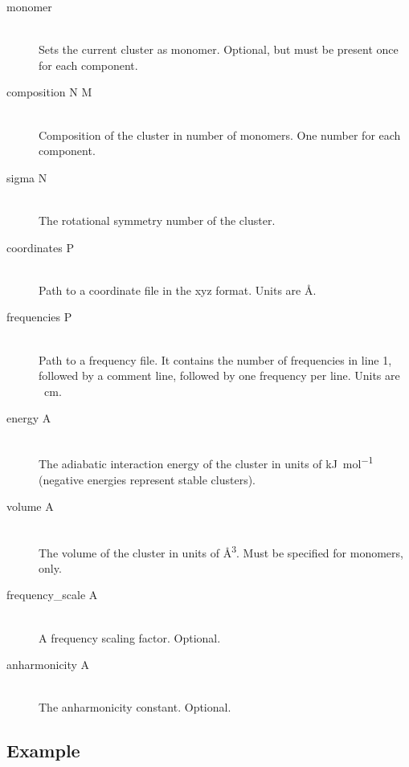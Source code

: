 \documentclass{scrartcl}
\begin{document}
\begin{description}
    \item[monomer] \hfill \\
        Sets the current cluster as monomer.
        Optional, but must be present once for each component.
        \vspace{0.1cm}
    \item[composition N M] \hfill \\
        Composition of the cluster in number of monomers.
        One number for each component.
        \vspace{0.1cm}
    \item[sigma N] \hfill \\
        The rotational symmetry number of the cluster.
        \vspace{0.1cm}
    \item[coordinates P] \hfill \\
        Path to a coordinate file in the xyz format.
        Units are \si{\angstrom}.
        \vspace{0.1cm}
    \item[frequencies P] \hfill \\
        Path to a frequency file.
        It contains the number of frequencies in line 1, followed by a comment line, followed by one frequency per line.
        Units are \si{\per\centi\meter}.
        \vspace{0.1cm}
    \item[energy A] \hfill \\
        The adiabatic interaction energy of the cluster in units of \si{\kilo\joule\per\mol} (negative energies represent stable clusters).
        \vspace{0.1cm}
    \item[volume A] \hfill \\
        The volume of the cluster in units of \si{\cubic\angstrom}.
        Must be specified for monomers, only.
        \vspace{0.1cm}
    \item[frequency\_scale A] \hfill \\
        A frequency scaling factor.
        Optional.
        \vspace{0.1cm}
    \item[anharmonicity A] \hfill \\
        The anharmonicity constant.
        Optional.
\end{description}

\subsection{Example}
\end{document}
